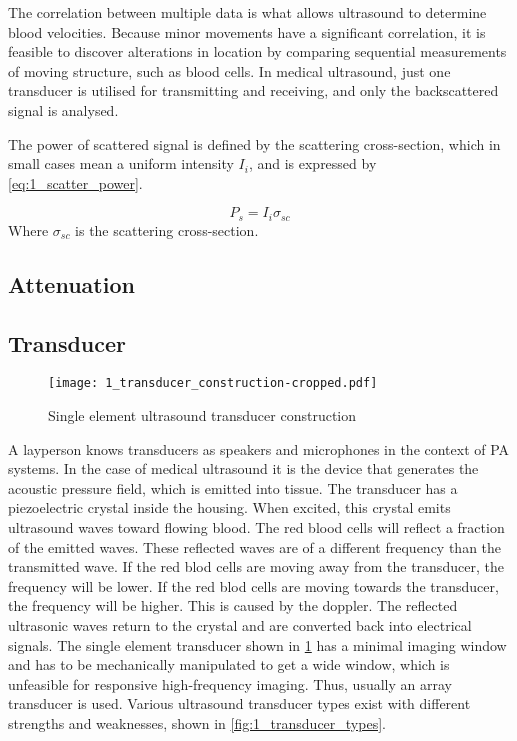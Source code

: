 The correlation between multiple data is what allows ultrasound to determine blood velocities.
Because minor movements have a significant correlation, it is feasible to discover alterations in location by comparing sequential measurements of moving structure, such as blood cells. In medical ultrasound, just one transducer is utilised for transmitting and receiving, and only the backscattered signal is analysed. 

The power of scattered signal is defined by the scattering cross-section, which in small cases mean a uniform intensity $I_{i}$, and is expressed by \cref{eq:1_scatter_power}.

\begin{equation} \label{eq:1_scatter_power}
	P_{s} = I_{i} \sigma_{s c}
\end{equation}
Where $\sigma_{s c}$ is the scattering cross-section. 

\subsection{Attenuation}

\subsection{Transducer}

\begin{figure}[ht]
	\centering
	\texttt{[image: 1\_transducer\_construction-cropped.pdf]}
	\caption{Single element ultrasound transducer construction \cite{JensenUltrasoundBook}}
	\label{fig:1_transducer_construction}
\end{figure}

A layperson knows transducers as speakers and microphones in the context of PA systems. In the case of medical ultrasound it is the device that generates the acoustic pressure field, which is emitted into tissue. The transducer has a piezoelectric crystal inside the housing. When excited, this crystal emits ultrasound waves toward flowing blood. The red blood cells will reflect a fraction of the emitted waves. These reflected waves are of a different frequency than the transmitted wave. If the red blod cells are moving away from the transducer, the frequency will be lower. If the red blod cells are moving towards the transducer, the frequency will be higher. This is caused by the \gls{doppler}. The reflected ultrasonic waves return to the crystal and are converted back into electrical signals. The single element transducer shown in \cref{fig:1_transducer_construction} has a minimal imaging window and has to be mechanically manipulated to get a wide window, which is unfeasible for responsive high-frequency imaging. Thus, usually an array transducer is used. Various ultrasound transducer types exist with different strengths and weaknesses, shown in \cref{fig:1_transducer_types}. 

